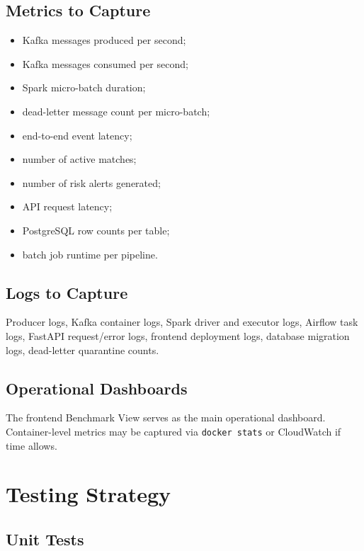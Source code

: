 \documentclass[11pt,a4paper]{article}
\begin{document}
\subsection{Metrics to Capture}

\begin{itemize}[nosep]
  \item Kafka messages produced per second;
  \item Kafka messages consumed per second;
  \item Spark micro-batch duration;
  \item dead-letter message count per micro-batch;
  \item end-to-end event latency;
  \item number of active matches;
  \item number of risk alerts generated;
  \item API request latency;
  \item PostgreSQL row counts per table;
  \item batch job runtime per pipeline.
\end{itemize}

\subsection{Logs to Capture}

Producer logs, Kafka container logs, Spark driver and executor logs, Airflow task logs, FastAPI
request/error logs, frontend deployment logs, database migration logs, dead-letter quarantine
counts.

\subsection{Operational Dashboards}

The frontend Benchmark View serves as the main operational dashboard. Container-level metrics may
be captured via \texttt{docker stats} or CloudWatch if time allows.

\section{Testing Strategy}

\subsection{Unit Tests}
\end{document}

